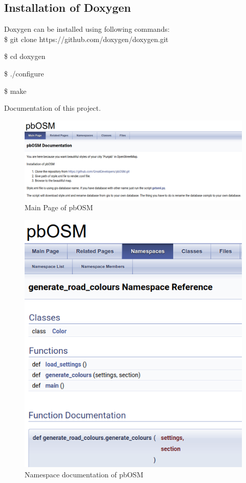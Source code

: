 \subsection{Installation of Doxygen}
Doxygen can be installed using following commands:\\

\hspace{4pt} \$ git clone https://github.com/doxygen/doxygen.git

\hspace{4pt} \$ cd doxygen

\hspace{4pt} \$ ./configure

\hspace{4pt} \$ make

Documentation of this project.

\begin{figure}[h!]
	\centering \includegraphics[scale=.4]{input/images/osm_doxygen.png}
	\caption{Main Page of pbOSM}
\end{figure}

\begin{figure}[h!]
	\centering \includegraphics[scale=.6]{input/images/osm_doxygen1.png}
	\caption{Namespace documentation of pbOSM}
\end{figure}

